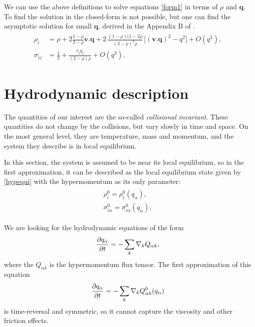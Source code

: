 We can use the above definitions to solve equations \ref{form1} in terms of $\rho$ and $\bm{q}$. To find the solution in the closed-form is not possible, but one can find the asymptotic solution for small $\bm{q}$, derived in the Appendix B of \cite{nasilowski}.
\begin{align} \label{hypequi}
\begin{split}
\rho_i &= \rho + 2 \frac{1-\rho}{2-\rho} \bm{v}.\bm{q} + 2 \, \frac{(1-\rho)(1-2\rho}{(2-\rho)^2 \rho} \, \big[(\bm{v}.\bm{q})^2 - q^2 \big] + O(q^3), \\
\sigma_{ij} &= \frac{1}{2} + \frac{v_j q_j}{(2-\rho)\rho} + O(q^3).
\end{split}
\end{align}

\section{Hydrodynamic description}
The quantities of our interest are the so-called \textit{collisional invariant}. These quantities do not change by the collisions, but vary slowly in time and space.
On the most general level, they are temperature, mass and momentum, and the system they describe is in local equilibrium. 

In this section, the system is assumed to be near its local equilibrium, so in the first approximation, it can be described as the local equilibrium state given by \ref{hypequi} with the hypermomentum as its only parameter:
\begin{align*}
\begin{split}
\rho_i^0 = \rho_i^0(q_{\alpha}), \\
\sigma_{i\alpha}^0 = \sigma_{i\alpha}^0(q_{\alpha}),
\end{split}
\end{align*}

We are looking for the hydrodynamic equations of the form
\begin{align} \label{hydroeq}
\frac{\partial q_{\alpha}}{\partial t} = - \sum_k \nabla_k Q_{\alpha k},
\end{align}
where the $Q_{\alpha k}$ is the hypermomentum flux tensor. The first approximation of this equation
\begin{align*}
\frac{\partial q_{\alpha}}{\partial t} = - \sum_k \nabla_k Q^0_{\alpha k}(q_{\alpha})
\end{align*}
is time-reversal and symmetric, so it cannot capture the viscosity and other friction effects.
 

